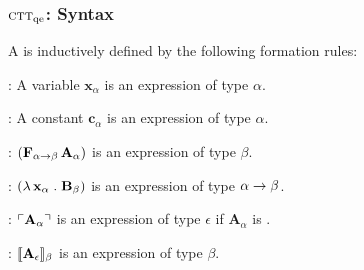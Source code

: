 \documentclass[t,12pt,numbers,fleqn]{beamer}
\newcommand{\churchqe}{$\mbox{\sc ctt}_{\rm qe}$}
\begin{document}
\begin{frame}
\frametitle{{\churchqe}: Syntax}
\bi

  \item A  is inductively defined
    by the following formation rules:

  \be

    \item {}: A variable $\textbf{x}_\alpha$ is an
      expression of type $\alpha$.

    \item {}: A constant $\textbf{c}_\alpha$ is an
      expression of type $\alpha$.

    \item {}: $(\textbf{F}_{\alpha \rightarrow
      \beta} \, \textbf{A}_\alpha)$ is an expression of type $\beta$.

    \item {}: $(\lambda\, \textbf{x}_\alpha
      \mathrel. \textbf{B}_\beta)$ is an expression of type $\alpha
      \rightarrow \beta$.

    \item {}: $\ulcorner\textbf{A}_\alpha\urcorner$ is an
      expression of type $\epsilon$ if $\textbf{A}_\alpha$ is
      .

    \item {}: $\llbracket\textbf{A}_\epsilon\rrbracket_\beta$
      is an expression of type $\beta$.

  \ee 

\pause 

\medskip

  \item {}

\ei
\end{frame}

\end{document}
